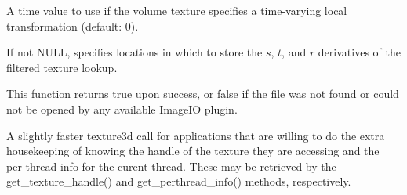 \vspace{-24pt}
\vspace{10pt}
A time value to use if the volume texture specifies a time-varying
local transformation (default: 0).
\apiend

\vspace{-24pt}
\vspace{10pt}
If not NULL, specifies locations in which to store the $s$, $t$, and $r$
derivatives of the filtered texture lookup.
\apiend

This function returns {\cf true} upon success, or {\cf false} if the
file was not found or could not be opened by any available ImageIO
plugin.

\apiend

A slightly faster {\cf texture3d} call for applications that are willing
to do the extra housekeeping of knowing the handle of the texture they
are accessing and the per-thread info for the curent thread.  These
may be retrieved by the {\cf get_texture_handle()} and 
{\cf get_perthread_info()} methods, respectively.
\apiend


